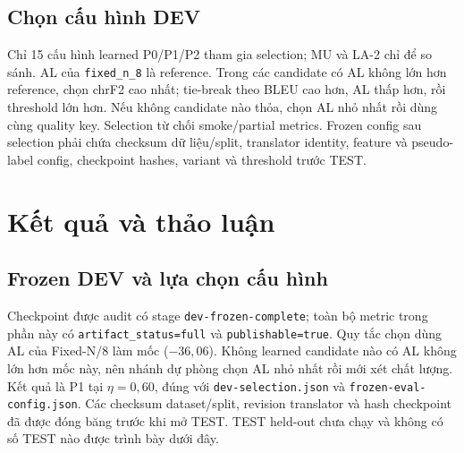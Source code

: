 \documentclass[conference]{IEEEtran}
\begin{document}
\subsection{Chọn cấu hình DEV}
Chỉ 15 cấu hình learned P0/P1/P2 tham gia selection; MU và LA-2 chỉ để so sánh. AL của \texttt{fixed\_n\_8} là reference. Trong các candidate có AL không lớn hơn reference, chọn chrF2 cao nhất; tie-break theo BLEU cao hơn, AL thấp hơn, rồi threshold lớn hơn. Nếu không candidate nào thỏa, chọn AL nhỏ nhất rồi dùng cùng quality key. Selection từ chối smoke/partial metrics. Frozen config sau selection phải chứa checksum dữ liệu/split, translator identity, feature và pseudo-label config, checkpoint hashes, variant và threshold trước TEST.

\section{Kết quả và thảo luận}
\subsection{Frozen DEV và lựa chọn cấu hình}
Checkpoint được audit có stage \texttt{dev-frozen-complete}; toàn bộ metric trong phần này có \texttt{artifact\_status=full} và \texttt{publishable=true}. Quy tắc chọn dùng AL của Fixed-N/8 làm mốc ($-36{,}06$). Không learned candidate nào có AL không lớn hơn mốc này, nên nhánh dự phòng chọn AL nhỏ nhất rồi mới xét chất lượng. Kết quả là P1 tại $\eta=0{,}60$, đúng với \texttt{dev-selection.json} và \texttt{frozen-eval-config.json}. Các checksum dataset/split, revision translator và hash checkpoint đã được đóng băng trước khi mở TEST. TEST held-out chưa chạy và không có số TEST nào được trình bày dưới đây.
\end{document}
